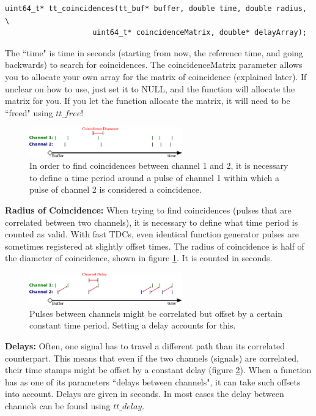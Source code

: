 \documentclass[10pt]{article}
\begin{document}
\begin{verbatim}
uint64_t* tt_coincidences(tt_buf* buffer, double time, double radius, \
                    uint64_t* coincidenceMatrix, double* delayArray);
\end{verbatim}

The ``time" is time in seconds (starting from now, the reference time, and going backwards) to search for coincidences. The coincidenceMatrix parameter allows you to allocate your own array for the matrix of coincidence (explained later). If unclear on how to use, just set it to NULL, and the function will allocate the matrix for you. If you let the function allocate the matrix, it will need to be ``freed" using $tt\_free$!

\begin{figure}
\begin{center}
\includegraphics[width=250px]{diameter.png}
\caption{In order to find coincidences between channel 1 and 2, it is necessary to define a time period around a pulse of channel 1 within which a pulse of channel 2 is considered a coincidence.}
\label{fig:diameter}
\end{center}
\end{figure}

\textbf{Radius of Coincidence:} When trying to find coincidences (pulses that are correlated between two channels), it is necessary to define what time period is counted as
valid. With fast TDCs, even identical function generator pulses are sometimes registered at slightly offset times. The radius of coincidence is half of the diameter of coincidence,
shown in figure \ref{fig:diameter}. It is counted in seconds.

\begin{figure}
\begin{center}
\includegraphics[width=250px]{delays.png}
\caption{Pulses between channels might be correlated but offset by a certain constant time period. Setting a delay accounts for this.}
\label{fig:delays}
\end{center}
\end{figure}

\textbf{Delays:} Often, one signal has to travel a different path than its correlated counterpart. This means that even if the two channels (signals) are correlated, 
their time stamps might be offset by a constant delay (figure \ref{fig:delays}).
When a function has as one of its parameters ``delays between channels", it can take such offsets into account. Delays are given in seconds. 
In most cases the delay between channels can be found using $tt\_delay$.
\end{document}
